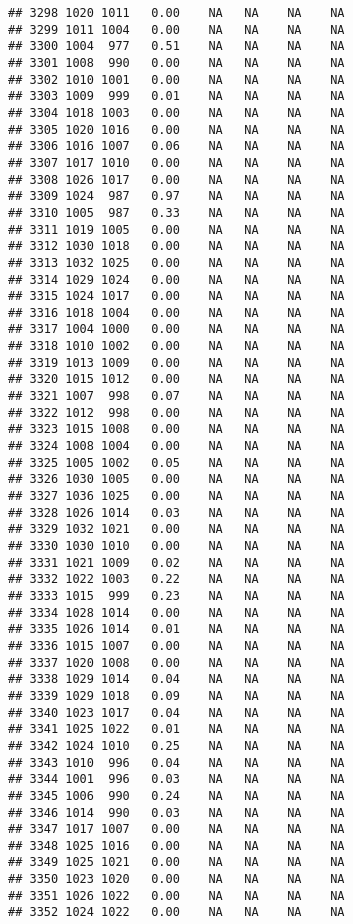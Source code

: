 \documentclass{article}\usepackage{graphicx, color}
\makeatletter
\newenvironment{kframe}{%
 \def\at@end@of@kframe{}%
 \ifinner\ifhmode%
  \def\at@end@of@kframe{\end{minipage}}%
  \begin{minipage}{\columnwidth}%
 \fi\fi%
 \def\FrameCommand##1{\hskip\@totalleftmargin \hskip-\fboxsep
 \colorbox{shadecolor}{##1}\hskip-\fboxsep
     \hskip-\linewidth \hskip-\@totalleftmargin \hskip\columnwidth}%
 \MakeFramed {\advance\hsize-\width
   \@totalleftmargin\z@ \linewidth\hsize
   \@setminipage}}%
 {\par\unskip\endMakeFramed%
 \at@end@of@kframe}
\newenvironment{knitrout}{}{} %
\makeatother
\begin{document}
\begin{knitrout}
\begin{kframe}
\begin{verbatim}
## 3298 1020 1011   0.00    NA   NA    NA    NA
## 3299 1011 1004   0.00    NA   NA    NA    NA
## 3300 1004  977   0.51    NA   NA    NA    NA
## 3301 1008  990   0.00    NA   NA    NA    NA
## 3302 1010 1001   0.00    NA   NA    NA    NA
## 3303 1009  999   0.01    NA   NA    NA    NA
## 3304 1018 1003   0.00    NA   NA    NA    NA
## 3305 1020 1016   0.00    NA   NA    NA    NA
## 3306 1016 1007   0.06    NA   NA    NA    NA
## 3307 1017 1010   0.00    NA   NA    NA    NA
## 3308 1026 1017   0.00    NA   NA    NA    NA
## 3309 1024  987   0.97    NA   NA    NA    NA
## 3310 1005  987   0.33    NA   NA    NA    NA
## 3311 1019 1005   0.00    NA   NA    NA    NA
## 3312 1030 1018   0.00    NA   NA    NA    NA
## 3313 1032 1025   0.00    NA   NA    NA    NA
## 3314 1029 1024   0.00    NA   NA    NA    NA
## 3315 1024 1017   0.00    NA   NA    NA    NA
## 3316 1018 1004   0.00    NA   NA    NA    NA
## 3317 1004 1000   0.00    NA   NA    NA    NA
## 3318 1010 1002   0.00    NA   NA    NA    NA
## 3319 1013 1009   0.00    NA   NA    NA    NA
## 3320 1015 1012   0.00    NA   NA    NA    NA
## 3321 1007  998   0.07    NA   NA    NA    NA
## 3322 1012  998   0.00    NA   NA    NA    NA
## 3323 1015 1008   0.00    NA   NA    NA    NA
## 3324 1008 1004   0.00    NA   NA    NA    NA
## 3325 1005 1002   0.05    NA   NA    NA    NA
## 3326 1030 1005   0.00    NA   NA    NA    NA
## 3327 1036 1025   0.00    NA   NA    NA    NA
## 3328 1026 1014   0.03    NA   NA    NA    NA
## 3329 1032 1021   0.00    NA   NA    NA    NA
## 3330 1030 1010   0.00    NA   NA    NA    NA
## 3331 1021 1009   0.02    NA   NA    NA    NA
## 3332 1022 1003   0.22    NA   NA    NA    NA
## 3333 1015  999   0.23    NA   NA    NA    NA
## 3334 1028 1014   0.00    NA   NA    NA    NA
## 3335 1026 1014   0.01    NA   NA    NA    NA
## 3336 1015 1007   0.00    NA   NA    NA    NA
## 3337 1020 1008   0.00    NA   NA    NA    NA
## 3338 1029 1014   0.04    NA   NA    NA    NA
## 3339 1029 1018   0.09    NA   NA    NA    NA
## 3340 1023 1017   0.04    NA   NA    NA    NA
## 3341 1025 1022   0.01    NA   NA    NA    NA
## 3342 1024 1010   0.25    NA   NA    NA    NA
## 3343 1010  996   0.04    NA   NA    NA    NA
## 3344 1001  996   0.03    NA   NA    NA    NA
## 3345 1006  990   0.24    NA   NA    NA    NA
## 3346 1014  990   0.03    NA   NA    NA    NA
## 3347 1017 1007   0.00    NA   NA    NA    NA
## 3348 1025 1016   0.00    NA   NA    NA    NA
## 3349 1025 1021   0.00    NA   NA    NA    NA
## 3350 1023 1020   0.00    NA   NA    NA    NA
## 3351 1026 1022   0.00    NA   NA    NA    NA
## 3352 1024 1022   0.00    NA   NA    NA    NA

\end{verbatim}
\end{kframe}
\end{knitrout}
\end{document}

